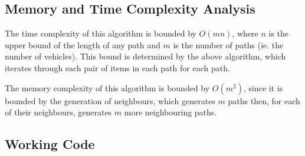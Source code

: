 \documentclass[12pt]{article}
\begin{document}
\subsection*{Memory and Time Complexity Analysis}
The time complexity of this algorithm is bounded by $O(mn)$, where $n$ is the upper bound of the length of any path and $m$ is the number of paths (ie. the number of vehicles). This bound is determined by the above  algorithm, which iterates through each pair of items in each path for each path.

The memory complexity of this algorithm is bounded by $O(m^2)$, since it is bounded by the generation of neighbours, which generates $m$ paths then, for each of their neighbours, generates $m$ more neighbouring paths.

\subsection*{Working Code}

\end{document}
